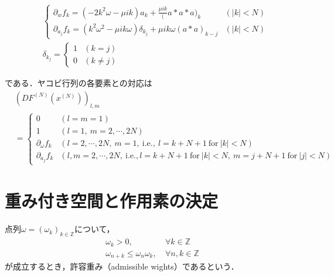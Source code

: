 \begin{align*}
   & \begin{cases}
       \partial_w f_k = (-2k^2\omega - \mu ik)a_k + \frac{\mu ik}(a*a*a)_k                     & (|k|<N) \\
       \partial_{a_j} f_k = (k^2\omega^2 - \mu ik\omega)\delta_{k_j} + \mu ik\omega(a*a)_{k-j} & (|k|<N)
     \end{cases}
  \\
   & \delta_{k_j} = \begin{cases}
                      1 & (k=j)     \\
                      0 & (k\neq j)
                    \end{cases}
\end{align*}

である．ヤコビ行列の各要素との対応は
\begin{align*}
   & \left(DF^{(N)}\left(x^{(N)}\right)\right)_{l,m}                                                                                        \\
   & = \begin{cases}
         0                   & \left(l=m=1\right)                                                                                             \\
         1                   & \left(l=1,\ m= 2,\cdots,2N\right)                                                                              \\
         \partial_\omega f_k & \left(l=2,\cdots,2N,\ m=1, \ \mathrm{i.e.},\ l=k+N+1 \ \mathrm{for} \ |k|<N\right)                             \\
         \partial_{a_j}f_k   & \left(l,m=2,\cdots,2N, \ \mathrm{i.e.}, l=k+N+1 \ \mathrm{for} \ |k|<N,\ m=j+N+1 \ \mathrm{for} \ |j|<N\right)
       \end{cases}
\end{align*}


\section{重み付き空間と作用素の決定}
\begin{dfn}[許容重み]
  \label{dfn:許容重み}
  点列$\omega = \left(\omega_k\right)_{k\in\mathbb{Z}}$について，
  \begin{align}
    \omega_k>0,\                           & \forall k \in \mathbb{Z}   \\
    \omega_{n+k} \leq \omega_n \omega_k,\  & \forall n,k\in\mathbb{Z}
  \end{align}
  が成立するとき，許容重み（admissible wights）であるという．
\end{dfn}

